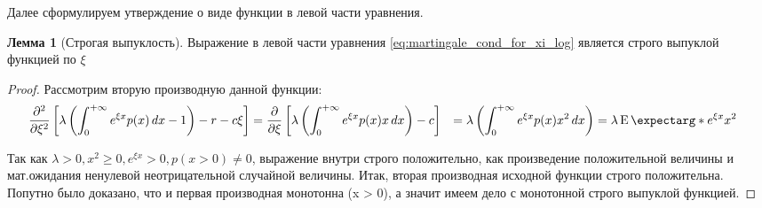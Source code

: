 \documentclass[a4paper,12pt]{article}
\theoremstyle{definition}
\newtheorem{lemma}{Лемма}
\newcommand{\expect}{\operatorname{E}\expectarg}
\begin{document}
Далее сформулируем утверждение о виде функции в левой части уравнения.
\begin{lemma}[Строгая выпуклость]\label{thm:strict_convexity_m1}
Выражение в левой части уравнения \eqref{eq:martingale_cond_for_xi_log} является строго выпуклой функцией по $\xi$
\end{lemma}
\begin{proof}
Рассмотрим вторую производную данной функции:
\begin{equation*}
\begin{split}
     \pdv[2]{}{\xi} \left[\lambda \left(\int_{0}^{+\infty} e^{\xi x} p(x) \,dx - 1\right) - r - c\xi \right] &= \pdv{}{\xi} \left[\lambda \left(\int_{0}^{+\infty} e^{\xi x} p(x) x \,dx \right) - c \right] &= \lambda \left(\int_{0}^{+\infty} e^{\xi x} p(x) x^{2} \,dx \right) &= \lambda \expect*{e^{\xi x} x^2}
\end{split}
\end{equation*}

Так как $\lambda > 0, x^2 \ge 0, e^{\xi x} > 0, p(x > 0) \neq 0$, выражение внутри строго положительно, как произведение положительной величины и мат.ожидания ненулевой неотрицательной случайной величины. Итак, вторая производная исходной функции строго положительна. Попутно было доказано, что и первая производная монотонна (x > 0), а значит имеем дело с монотонной строго выпуклой функцией.

\end{proof}
\end{document}
